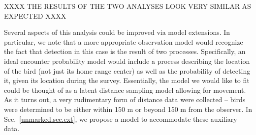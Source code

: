 XXXX THE RESULTS OF THE TWO ANALYSES LOOK VERY SIMILAR AS EXPECTED XXXX


Several aspects of this analysis could be improved via model
extensions. In particular, we note that a more appropriate observation
model would recognize the fact that detection in this case is the
result of two processes. Specifically, an ideal encounter probability
model would include a process describing the location of the bird (not
just its home range center) as well as the probability of detecting
it, given its location during the survey. 
Essentially, the model we
would like to fit could be thought of as a latent distance sampling
model allowing for movement. As it turns out,
a very rudimentary form of distance data were collected -- birds were
determined to be either within 150 m or beyond 150 m from the
observer. In Sec.~\ref{unmarked.sec.ext}, we
propose a model to accommodate these auxiliary data.


